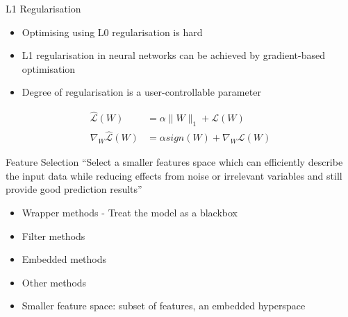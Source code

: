 \documentclass[11pt,compress,t,notes=noshow, aspectratio=169, xcolor=table]{beamer}
\begin{document}
\begin{frame}{L1 Regularisation}
    \begin{itemize}
        \item Optimising using L0 regularisation is hard
        \item L1 regularisation in neural networks can be achieved by gradient-based optimisation
        \item Degree of regularisation is a user-controllable parameter
    \end{itemize}
   
   \begin{align*}
       \mathcal{\hat{L}}(W) &= \alpha\|W\|_1 + \mathcal{L}(W)\\
       \nabla_W\mathcal{\hat{L}}(W) &= \alpha sign(W) + \nabla_W\mathcal{L}(W)
   \end{align*}
 
\end{frame}

\begin{frame}{Feature Selection}
    “Select a smaller features space which can efficiently describe the input data while reducing effects from noise or
irrelevant variables and still provide good prediction results”
\bigskip
    \begin{itemize}
        \item Wrapper methods - Treat the model as a blackbox
        \item Filter methods
        \item Embedded methods
        \item Other methods
        \bigskip
        \item Smaller feature space: subset of features, an embedded hyperspace
    \end{itemize}
\end{frame}
\end{document}
